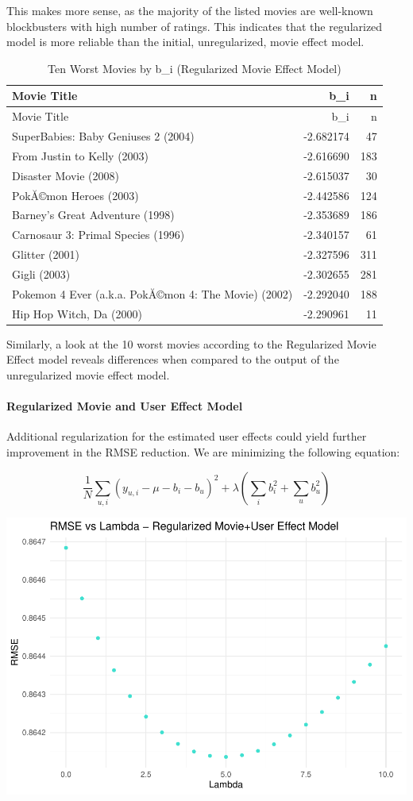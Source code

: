 \documentclass[
]{article}
\let\oldparagraph\paragraph
\renewcommand{\paragraph}[1]{\oldparagraph{#1}\mbox{}}
\begin{document}
This makes more sense, as the majority of the listed movies are
well-known blockbusters with high number of ratings. This indicates that
the regularized model is more reliable than the initial, unregularized,
movie effect model.

\begin{longtable}[]{@{}lrr@{}}
\caption{Ten Worst Movies by b\_i (Regularized Movie Effect
Model)}\tabularnewline
\toprule
Movie Title & b\_i & n\tabularnewline
\midrule
\endfirsthead
\toprule
Movie Title & b\_i & n\tabularnewline
\midrule
\endhead
SuperBabies: Baby Geniuses 2 (2004) & -2.682174 & 47\tabularnewline
From Justin to Kelly (2003) & -2.616690 & 183\tabularnewline
Disaster Movie (2008) & -2.615037 & 30\tabularnewline
PokĂ©mon Heroes (2003) & -2.442586 & 124\tabularnewline
Barney's Great Adventure (1998) & -2.353689 & 186\tabularnewline
Carnosaur 3: Primal Species (1996) & -2.340157 & 61\tabularnewline
Glitter (2001) & -2.327596 & 311\tabularnewline
Gigli (2003) & -2.302655 & 281\tabularnewline
Pokemon 4 Ever (a.k.a. PokĂ©mon 4: The Movie) (2002) & -2.292040 &
188\tabularnewline
Hip Hop Witch, Da (2000) & -2.290961 & 11\tabularnewline
\bottomrule
\end{longtable}

Similarly, a look at the 10 worst movies according to the Regularized
Movie Effect model reveals differences when compared to the output of
the unregularized movie effect model.

\hypertarget{regularized-movie-and-user-effect-model}{%
\paragraph{Regularized Movie and User Effect
Model}\label{regularized-movie-and-user-effect-model}}

Additional regularization for the estimated user effects could yield
further improvement in the RMSE reduction. We are minimizing the
following equation:

\[\frac{1}{N} \sum_{u,i} (y_{u,i} - \mu - b_{i} - b_{u})^{2} + \lambda (\sum_{i} b_{i}^2 + \sum_{u} b_{u}^2)\]

\begin{center}\includegraphics{MovieLens-Report_MitjaPrah_files/figure-latex/unnamed-chunk-47-1} \end{center}
\end{document}
